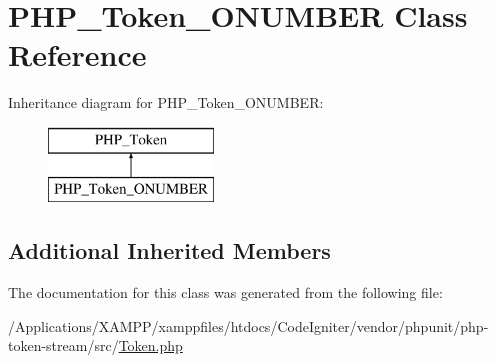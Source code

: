 \hypertarget{class_p_h_p___token___o_n_u_m_b_e_r}{}\section{P\+H\+P\+\_\+\+Token\+\_\+\+O\+N\+U\+M\+B\+ER Class Reference}
\label{class_p_h_p___token___o_n_u_m_b_e_r}
Inheritance diagram for P\+H\+P\+\_\+\+Token\+\_\+\+O\+N\+U\+M\+B\+ER\+:\begin{figure}[H]
\begin{center}
\leavevmode
\includegraphics[height=2.000000cm]{class_p_h_p___token___o_n_u_m_b_e_r}
\end{center}
\end{figure}
\subsection*{Additional Inherited Members}


The documentation for this class was generated from the following file\+:\begin{DoxyCompactItemize}
\item 
/\+Applications/\+X\+A\+M\+P\+P/xamppfiles/htdocs/\+Code\+Igniter/vendor/phpunit/php-\/token-\/stream/src/\mbox{\hyperlink{_token_8php}{Token.\+php}}\end{DoxyCompactItemize}
